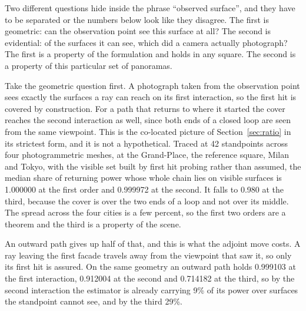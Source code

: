 Two different questions hide inside the phrase ``observed surface'', and they
have to be separated or the numbers below look like they disagree. The first is
geometric: can the observation point see this surface at all? The second is
evidential: of the surfaces it can see, which did a camera actually photograph?
The first is a property of the formulation and holds in any square. The second
is a property of this particular set of panoramas.

Take the geometric question first. A photograph taken from the observation point
sees exactly the surfaces a ray can reach on its first interaction, so the first
hit is covered by construction. For a path that returns to where it started the
cover reaches the second interaction as well, since both ends of a closed loop
are seen from the same viewpoint. This is the co-located picture of
Section~\ref{sec:ratio} in its strictest form, and it is not a hypothetical.
Traced at 42 standpoints across four photogrammetric meshes, at the Grand-Place,
the reference square, Milan and Tokyo,
with the visible set built by first hit probing rather than assumed, the median
share of returning power whose whole chain lies on visible surfaces is 1.000000
at the first order and 0.999972 at the second. It falls to 0.980 at the third,
because the cover is over the two ends of a loop and not over its middle. The
spread across the four cities is a few percent, so the first two orders are a
theorem and the third is a property of the scene.

An outward path gives up half of that, and this is what the adjoint move costs.
A ray leaving the first facade travels away from the viewpoint that saw it, so
only its first hit is assured. On the same geometry an outward path holds
0.999103 at the first interaction, 0.912004 at the second and 0.714182 at the
third, so by the second interaction the estimator is already carrying 9\% of
its power over surfaces the standpoint cannot see, and by the third 29\%.

